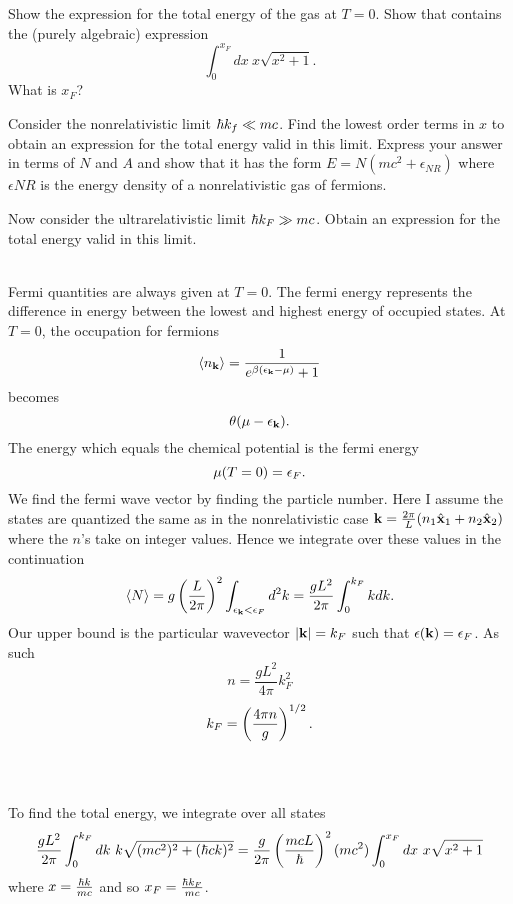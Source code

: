 \documentclass[10pt,letterpaper]{article}
\begin{document}
	\item
	Show the expression for the total energy of the gas at $T=0$. Show that contains the (purely algebraic)
	expression
	\[
		\int_{0}^{x_F} dx\ x\sqrt{x^2+1}.
	\]
	What is $x_F$?
	
	\item
	Consider the nonrelativistic limit $\hbar k_f \ll mc$. Find the lowest order terms in $x$ to obtain an expression
	for the total energy valid in this limit. Express your answer in terms of $N$ and $A$ and show that it has 
	the form $E = N(mc^2+\epsilon_{NR})$ where $\epsilon{NR}$ is the energy density of a nonrelativistic gas 
	of fermions. 
	
	\item
	Now consider the ultrarelativistic limit $\hbar k_F \gg mc$. Obtain an expression for the total energy valid
	in this limit.
	\\ \\
	\eenum 
	
	\benum
	\item
	Fermi quantities are always given at $T=0$. The fermi energy represents the difference in energy between the 
	lowest and highest energy of occupied states. At $T=0$, the occupation for fermions
	\[
		\braket{n_{\mathbf{k}}} = \frac{1}{e^{\beta(\epsilon_{\mathbf{k}} -\mu)} +1}
	\]
	becomes
	\[
		\theta(\mu-\epsilon_{\mathbf{k}}).
	\]
	The energy which equals the chemical potential is the fermi energy
	\[
		\mu(T=0) = \epsilon_F.
	\]
	We find the fermi wave vector by finding the particle number. Here I assume the states are quantized the
	same as in the nonrelativistic case $\mathbf{k} = \frac{2\pi}{L}(n_1\hat{\mathbf{x}}_1 +n_2\hat{\mathbf{x}}_2)$ where the
	$n$'s take on integer values. Hence we integrate over these values in the continuation
	\[
		\braket{N} = g\left(\frac{L}{2\pi}\right)^2\int_{\epsilon_{\mathbf{k}} < \epsilon_F} d^2k = \frac{gL^2}{2\pi} \int_0^{k_F} kdk.
	\]
	Our upper bound is the particular wavevector $|\mathbf{k}| = k_F$ such that $\epsilon(\mathbf{k}) = \epsilon_F$. As such
	\[
		n = \frac{gL^2}{4\pi}k_F^2
	\]
	\[
		k_F = \left(\frac{4\pi n}{g}\right)^{1/2}.
	\]
	\\ \\
	
	\item
	To find the total energy, we integrate over all states
	\[
		\frac{gL^2}{2\pi} \int_0^{k_F} dk\  k\sqrt{(mc^2)^2+(\hbar c k)^2} = \frac{g}{2\pi}\left(\frac{mcL}{\hbar}\right)^2(mc^2)
		\int_0^{x_F} dx\ x\sqrt{x^2+1}
	\]
	where $x = \frac{\hbar k}{mc}$ and so $x_F = \frac{\hbar k_F}{mc}$. 
	\\ \\
	
\end{document}
